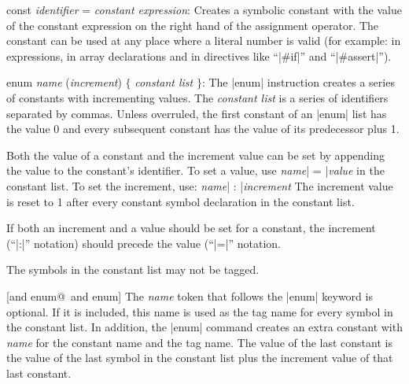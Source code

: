     \beginlist{35pt}
    \item const {\it identifier\/} = {\it constant expression\/}:
            Creates a symbolic constant with the value of the constant
            expression on the right hand of the assignment operator. The
            constant can be used at any place where a literal number is valid
            (for example: in expressions, in array declarations and in
            directives like ``|#if|'' and ``|#assert|'').

    \item enum {\it name\/} ({\it increment}) $\{$ {\it constant list\/} $\}$:
     
            The |enum| instruction creates a series of constants with
            incrementing values. %
            The {\it constant list\/} is a series of identifiers separated by
            commas. Unless overruled, the first constant of an |enum| list has
            the value 0 and every subsequent constant has the value of its
            predecessor plus 1.

            Both the value of a constant and the increment value can be set
            by appending the value to the constant's identifier.
            To set a value, use %
            \tabto 35pt {\it name}| = |{\it value} \lbreak
            in the constant list. To set the increment, use:
            \tabto 35pt {\it name}| : |{\it increment} \lbreak
            The increment value is reset to 1 after every constant symbol
            declaration in the constant list.

            If both an increment and a value should be set for a constant, the
            increment (``|:|'' notation) should precede the value (``|=|''
            notation.

            The symbols in the constant list may not be tagged.

            [and enum@\midtilde\ and enum]
            The {\it name\/} token that follows the |enum| keyword is optional.
            If it is included, this name is used as the tag name for every
            symbol in the constant list.
            In addition, the |enum| command creates an extra constant with
            {\it name\/} for the constant name and the tag name. The value of the
            last constant is the value of the last symbol in the constant list
            plus the increment value of that last constant.

